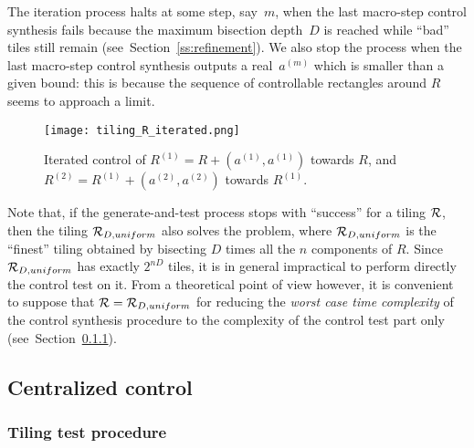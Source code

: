The iteration process halts
at some step, say~$m$, when the last
macro-step control synthesis fails because
the maximum bisection depth~$D$ is reached while ``bad'' tiles still remain
(see~Section~\ref{ss:refinement}). We also stop
the process when the last macro-step control synthesis outputs
a real~$a^{(m)}$ which
is smaller than a given bound: this is because the 
sequence of controllable rectangles around $R$ seems to
approach a limit.


\begin{figure}[t]
  \centering
 \texttt{[image: tiling\_R\_iterated.png]}
  \caption{Iterated control of $R^{(1)}=R+(a^{(1)},a^{(1)})$ towards $R$,
and $R^{(2)}=R^{(1)}+(a^{(2)},a^{(2)})$ towards $R^{(1)}$.}
 \label{fig:iteration}
\end{figure}




\begin{remark}\label{rk1}
Note that, if the generate-and-test process stops with ``success'' for a tiling
${\cal R}$, then the tiling
${\cal R}_{D,uniform}$ also solves the problem,
where ${\cal R}_{D,uniform}$
is the ``finest'' tiling obtained 
by bisecting $D$ times all the $n$ components of $R$.
Since ${\cal R}_{D,uniform}$ has exactly $2^{nD}$ tiles, 
it is in general impractical to perform directly the control test on it.
From a theoretical point of view however, 
it is convenient to suppose that ${\cal R}={\cal R}_{D,uniform}$ 
for reducing the \emph{worst case time complexity }
of the control synthesis procedure to the complexity 
of the control test part only
(see~Section~\ref{ss:macro_cent}).
\end{remark}


\subsection{Centralized control}\label{sec:one-step}

\subsubsection{Tiling test procedure}\label{ss:macro_cent}

